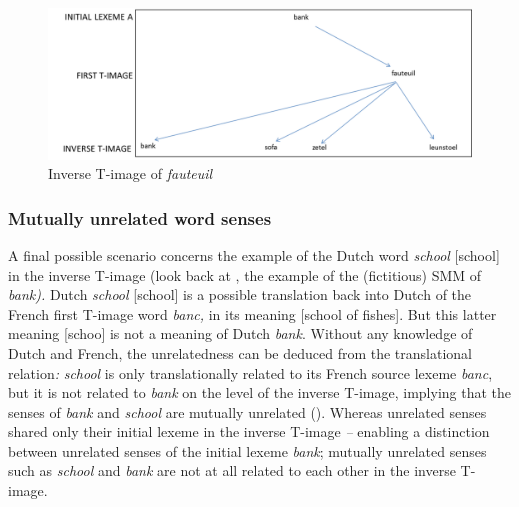 \begin{figure}
\includegraphics[height=.3\textheight]{figures/Vandevoorde2-img12.png}
\caption{\label{fig:key:13}  Inverse T-image of \textit{fauteuil}}
\end{figure}

\subsubsection{\label{sec:3.4.3.3}  Mutually unrelated word senses}

A final possible scenario concerns the example of the Dutch word \textit{school} [school] in the inverse T-image (look back at , the example of the (fictitious) SMM of \textit{bank).} Dutch \textit{school} [school] is a possible translation back into Dutch of the French first T-image word \textit{banc,} in its meaning [school of fishes]. But this latter meaning [schoo] is not a meaning of Dutch \textit{bank}. Without any knowledge of Dutch and French, the unrelatedness can be deduced from the translational relation\textit{:} \textit{school} is only translationally related to its French source lexeme \textit{banc}, but it is not related to \textit{bank} on the level of the inverse T-image, implying that the senses of \textit{bank} and \textit{school} are mutually unrelated (). Whereas unrelated senses shared only their initial lexeme in the inverse T-image \textit{–} enabling a distinction between unrelated senses of the initial lexeme \textit{bank}; mutually unrelated senses such as \textit{school} and \textit{bank} are not at all related to each other in the inverse T-image.


